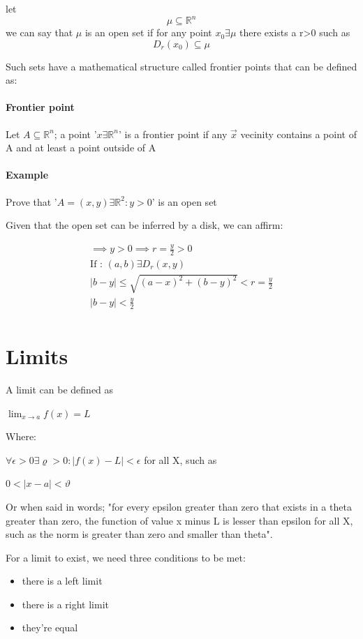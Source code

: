 \documentclass[11pt,fleqn]{book} %
\begin{document}
let $$ \mu \subseteq \mathbb{R}^n $$ we can say that $\mu$ is an open set if  for any point $x_0 \exists \mu$
there exists a r>0 such as $$D_r(x_0) \subseteq \mu$$

Such sets have a mathematical structure called frontier points that can be defined as:
\paragraph*{Frontier point}
Let $ A \subseteq \mathbb{R}^n $; a point '$x \exists \mathbb{R}^n$' is a frontier point if any $ \vec{x} $
vecinity contains a point of A and at least a point outside of A

\paragraph*{Example}

Prove that '$A = (x,y)\exists\mathbb{R}^2: y > 0$' is an open set

Given that the open set can be inferred by a disk, we can affirm:

\begin{gather}
    \implies y>0 \implies r = \frac{y}{2} > 0 \\
    \text{If : }(a,b)\exists D_r(x,y)\\
    | b-y | \le \sqrt{(a-x)^2 + (b-y)^2} < r = \frac{y}{2} \\
    |b-y| < \frac{y}{2}\\
\end{gather}

\section{Limits}
A limit can be defined as

$ \lim_{x \to a} f(x) = L $

Where:

$ \forall \epsilon > 0 \exists \varrho > 0: | f(x) - L | < \epsilon $
for all X, such as 

$ 0 < |x-a| < \vartheta $

Or when said in words; "for every epsilon greater than zero that exists in a theta greater than zero, the function of value x minus L is lesser than epsilon for all X, such as the norm is greater than zero and smaller than theta".

For a limit to exist, we need three conditions to be met:

\begin{itemize}
    \item there is a left limit
    \item there is a right limit
    \item they're equal
\end{itemize}
\end{document}
